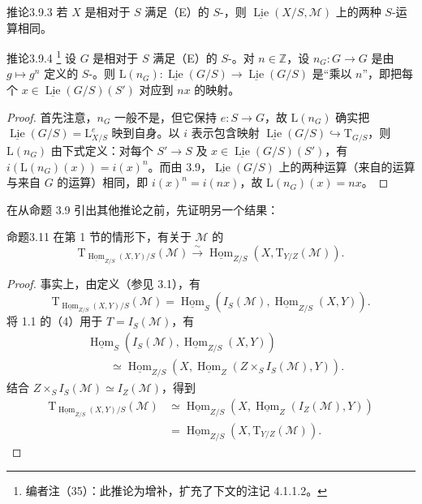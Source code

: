 \begin{SGAresult}{推论}{3.9.3}
若 $X$ 是相对于 $S$ 满足（E）的 $S$-，则 $\underline{\operatorname{Lie}}(X/S,\mathcal M)$ 上的两种 $S$-运算相同。
\end{SGAresult}
\begin{SGAresult}{推论}{3.9.4}
\footnote{编者注（35）：此推论为增补，扩充了下文的注记 4.1.1.2。} 设 $G$ 是相对于 $S$ 满足（E）的 $S$-。对 $n\in\mathbb Z$，设 $n_G:G\to G$ 是由 $g\mapsto g^n$ 定义的 $S$-。则 $\mathrm L(n_G):\underline{\operatorname{Lie}}(G/S)\to\underline{\operatorname{Lie}}(G/S)$ 是“乘以 $n$”，即把每个 $x\in\underline{\operatorname{Lie}}(G/S)(S')$ 对应到 $nx$ 的映射。
\end{SGAresult}
\begin{proof}
首先注意，$n_G$ 一般不是，但它保持 $e:S\to G$，故 $\mathrm L(n_G)$ 确实把 $\underline{\operatorname{Lie}}(G/S)=\mathrm L^e_{X/S}$ 映到自身。以 $i$ 表示包含映射 $\underline{\operatorname{Lie}}(G/S)\hookrightarrow\mathrm T_{G/S}$，则 $\mathrm L(n_G)$ 由下式定义：对每个 $S'\to S$ 及 $x\in\underline{\operatorname{Lie}}(G/S)(S')$，有 $i(\mathrm L(n_G)(x))=i(x)^n$。而由 3.9，$\underline{\operatorname{Lie}}(G/S)$ 上的两种运算（来自的运算与来自 $G$ 的运算）相同，即 $i(x)^n=i(nx)$，故 $\mathrm L(n_G)(x)=nx$。
\end{proof}
在从命题 3.9 引出其他推论之前，先证明另一个结果：
\begin{SGAresult}{命题}{3.11}
在第 1 节的情形下，有关于 $\mathcal M$ 的
\[
\mathrm T_{\underline{\operatorname{Hom}}_{Z/S}(X,Y)/S}(\mathcal M)
\xrightarrow\sim\underline{\operatorname{Hom}}_{Z/S}(X,\mathrm T_{Y/Z}(\mathcal M)).
\]
\end{SGAresult}
\begin{proof}
事实上，由定义（参见 3.1），有
\[
\mathrm T_{\underline{\operatorname{Hom}}_{Z/S}(X,Y)/S}(\mathcal M)
=\underline{\operatorname{Hom}}_S(I_S(\mathcal M),\underline{\operatorname{Hom}}_{Z/S}(X,Y)).
\]
将 1.1 的（4）用于 $T=I_S(\mathcal M)$，有
\[
\begin{aligned}
{}&\underline{\operatorname{Hom}}_S(I_S(\mathcal M),\underline{\operatorname{Hom}}_{Z/S}(X,Y))\\
&\qquad\simeq\underline{\operatorname{Hom}}_{Z/S}(X,\underline{\operatorname{Hom}}_Z(Z\times_S I_S(\mathcal M),Y)).
\end{aligned}
\]
结合 $Z\times_S I_S(\mathcal M)\simeq I_Z(\mathcal M)$，得到
\[
\begin{aligned}
\mathrm T_{\underline{\operatorname{Hom}}_{Z/S}(X,Y)/S}(\mathcal M)
&\simeq\underline{\operatorname{Hom}}_{Z/S}(X,\underline{\operatorname{Hom}}_Z(I_Z(\mathcal M),Y))\\
&=\underline{\operatorname{Hom}}_{Z/S}(X,\mathrm T_{Y/Z}(\mathcal M)).
\end{aligned}
\]
\end{proof}
